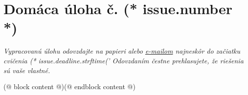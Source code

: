 \documentclass[12pt, twoside]{dgs}
\begin{document}
    \pagestyle{homework}
    \setcounter{section}{(* issue.number - 1 *)}
    \section{Domáca úloha č. (* issue.number *)}
    \begin{center}
        \textit{%
            Vypracovanú úlohu odovzdajte na papieri alebo \href{mailto:(* year.teacher.email *)}{e-mailom}
            najneskôr do začiatku cvičenia (* issue.deadline.strftime('%
            Odovzdaním čestne prehlasujete, že riešenia sú vaše vlastné.}
    \end{center}
    (@ block content @)(@ endblock content @)
\end{document}
